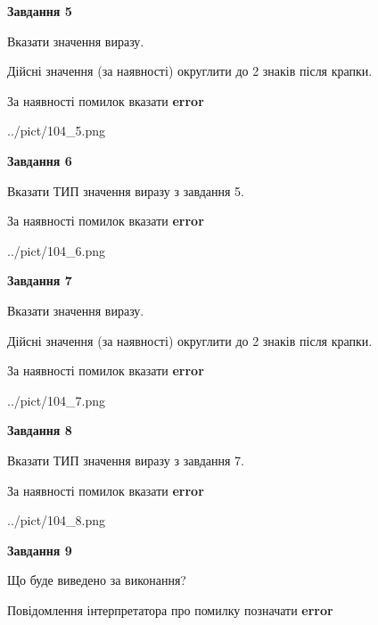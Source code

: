 \documentclass[11pt, ukrainian]{article}
\begin{document}
{\begin {large}
{\begin {center}\textbf{Завдання 5}\end {center}}\par
Вказати значення виразу. \par
Дійсні значення (за наявності) округлити до 2 знаків після крапки. \par
За наявності помилок вказати \textbf{error}

\begin{center}
	{../pict/104_5.png}
\end{center}
\newpage

{\begin {center}\textbf{Завдання 6}\end {center}}\par
Вказати ТИП значення виразу з завдання 5. \par
За наявності помилок вказати \textbf{error}

\begin{center}
	{../pict/104_6.png}
\end{center}
\newpage

{\begin {center}\textbf{Завдання 7}\end {center}}\par
Вказати значення виразу. \par
Дійсні значення (за наявності) округлити до 2 знаків після крапки. \par
За наявності помилок вказати \textbf{error}

\begin{center}
	{../pict/104_7.png}
\end{center}
\newpage

{\begin {center}\textbf{Завдання 8}\end {center}}\par
Вказати ТИП значення виразу з завдання 7. \par
За наявності помилок вказати \textbf{error}

\begin{center}
	{../pict/104_8.png}
\end{center}
\newpage

{\begin {center}\textbf{Завдання 9}\end {center}}\par
Що буде виведено за виконання? \par
Повідомлення інтерпретатора про помилку позначати \textbf{error}


\end{large}}
\end{document}
